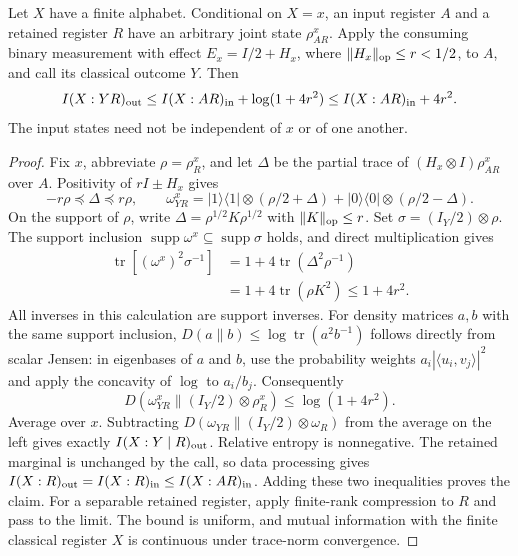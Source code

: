 \begin{lemma}
\label{lem:weakmeasurementinfo78}
Let $X$ have a finite alphabet.  Conditional on $X=x$, an input
register $A$ and a retained register $R$ have an arbitrary joint
state $\rho^x_{AR}$.  Apply the consuming binary measurement with
effect $E_x=I/2+H_x$, where $\|H_x\|_{\rm op}\le r<1/2$, to
$A$, and call its classical outcome $Y$.  Then
\begin{equation}\label{eq:weakmeasurementinfo78}
 I(X:YR)_{\rm out}
 \le I(X:AR)_{\rm in}+\log(1+4r^2)
 \le I(X:AR)_{\rm in}+4r^2.
\end{equation}
The input states need not be independent of $x$ or of one another.
\end{lemma}
\begin{proof}
Fix $x$, abbreviate $\rho=\rho^x_R$, and let $\Delta$ be the
partial trace of $(H_x\otimes I)\rho^x_{AR}$ over $A$.  Positivity
of $rI\pm H_x$ gives
\[
 -r\rho\preceq\Delta\preceq r\rho,
 \qquad
 \omega^x_{YR}
 =|1\rangle\langle1|\otimes(\rho/2+\Delta)
  +|0\rangle\langle0|\otimes(\rho/2-\Delta).
\]
On the support of $\rho$, write
$\Delta=\rho^{1/2}K\rho^{1/2}$ with $\|K\|_{\rm op}\le r$.
Set $\sigma=(I_Y/2)\otimes\rho$.  The support inclusion
$\operatorname{supp}\omega^x\subseteq\operatorname{supp}\sigma$
holds, and direct multiplication gives
\begin{align*}
 \operatorname{tr}[(\omega^x)^2\sigma^{-1}]
 &=1+4\operatorname{tr}(\Delta^2\rho^{-1})\\
 &=1+4\operatorname{tr}(\rho K^2)\le1+4r^2.
\end{align*}
All inverses in this calculation are support inverses.  For density
matrices $a,b$ with the same support inclusion,
$D(a\|b)\le\log\operatorname{tr}(a^2b^{-1})$ follows directly
from scalar Jensen: in eigenbases of $a$ and $b$, use the probability
weights $a_i|\langle u_i,v_j\rangle|^2$ and apply the concavity of
$\log$ to $a_i/b_j$.  Consequently
\[
 D(\omega^x_{YR}\|(I_Y/2)\otimes\rho^x_R)
 \le\log(1+4r^2).
\]
Average over $x$.  Subtracting
$D(\omega_{YR}\|(I_Y/2)\otimes\omega_R)$ from the average on
the left gives exactly $I(X:Y\mid R)_{\rm out}$.  Relative entropy
is nonnegative.  The retained marginal is unchanged by the call,
so data processing gives
$I(X:R)_{\rm out}=I(X:R)_{\rm in}\le I(X:AR)_{\rm in}$.
Adding these two inequalities proves the claim.
For a separable retained register, apply finite-rank compression to
$R$ and pass to the limit.  The bound is uniform, and mutual
information with the finite classical register $X$ is continuous
under trace-norm convergence.
\end{proof}

